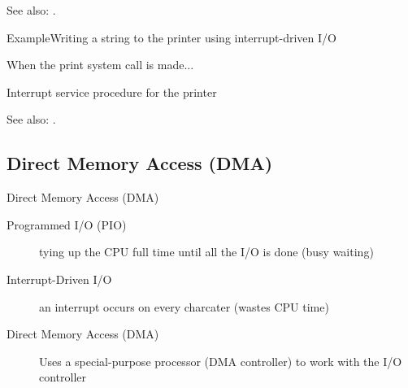See also: .

\begin{frame}{Example}{Writing a string to the printer using interrupt-driven I/O}
  \begin{block}{When the print system call is made...}
    \begin{center}
       
    \end{center}
  \end{block}
  \begin{block}{Interrupt service procedure for the printer}
    \begin{center}
       
    \end{center}
  \end{block}
\end{frame}

See also: .

\subsection{Direct Memory Access (DMA)}

\begin{frame}{Direct Memory Access (DMA)}
  \begin{description}
  \item[Programmed I/O (PIO)] tying up the CPU full time until all the I/O is done (busy waiting)
  \item[Interrupt-Driven I/O] an interrupt occurs on every charcater (wastes CPU time)
  \item[Direct Memory Access (DMA)] Uses a special-purpose processor (DMA controller) to
    work with the I/O controller
  \end{description}  
\end{frame}

